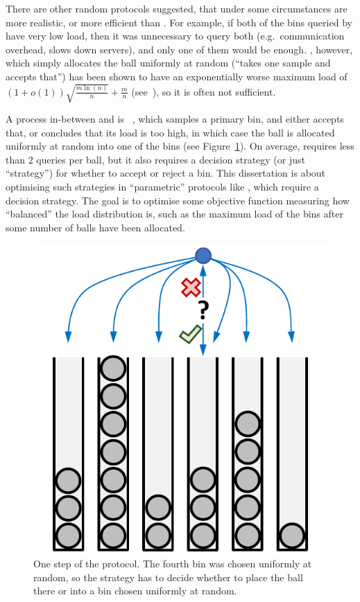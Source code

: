There are other random protocols suggested, that under some circumstances are more realistic, or more efficient than \TwoChoice. For example, if both of the bins queried by \TwoChoice have very low load, then it was unnecessary to query both (e.g.\ communication overhead, slows down servers), and only one of them would be enough. \OneChoice, however, which simply allocates the ball uniformly at random (``takes one sample and accepts that'') has been shown to have an exponentially worse maximum load of $(1+o(1))\sqrt{\frac{m\ln(n)}{n}}+\frac{m}{n}$ (see~\cite{mitzenmacher2005probabilitybook}), so it is often not sufficient. 


A process in-between \OneChoice and \TwoChoice is \TwoThinning~\cite{feldheim2021thinning}, which samples a primary bin, and either accepts that, or concludes that its load is too high, in which case the ball is allocated uniformly at random into one of the bins (see Figure~\ref{two-thinning-intro}). On average, \TwoThinning requires less than $2$ queries per ball, but it also requires a decision strategy (or just ``strategy'') for whether to accept or reject a bin. This dissertation is about optimising such strategies in ``parametric'' protocols like \TwoThinning, which require a decision strategy. The goal is to optimise some objective function measuring how ``balanced'' the load distribution is, such as the maximum load of the bins after some number of balls have been allocated.



\begin{figure}
    \centering
    \includegraphics{Chapter1/Figs/two_thinning_intro.pdf}
    \caption{One step of the \TwoThinning protocol. The fourth bin was chosen uniformly at random, so the strategy has to decide whether to place the ball there or into a bin chosen uniformly at random.}
    \label{two-thinning-intro}
\end{figure}



